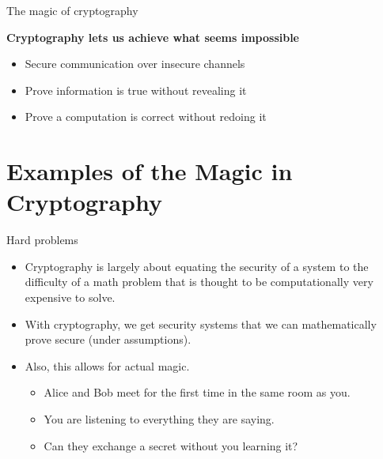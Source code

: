 \ifdefined\PRESENTATION\else\PassOptionsToClass{handout}{beamer}\fi\documentclass[aspectratio=169, lualatex]{beamer}
\begin{document}
\begin{frame}[c]{The magic of cryptography}
	\begin{center}
		\Large\textbf{Cryptography lets us achieve what seems impossible}
		\vspace{1cm}
		\begin{itemize}[<+->]
			\item Secure communication over insecure channels
			\item Prove information is true without revealing it
			\item Prove a computation is correct without redoing it
		\end{itemize}
	\end{center}
\end{frame}

\section{Examples of the Magic in Cryptography}

\begin{frame}{Hard problems}
	\begin{itemize}[<+->]
		\item Cryptography is largely about equating the security of a system to the
		      difficulty of a math problem that is thought to be computationally
		      very expensive to solve.
		\item With cryptography, we get security systems that we can
		      mathematically prove secure (under assumptions).
		\item Also, this allows for actual magic.
		      \begin{itemize}[<+->]
			      \item Alice and Bob meet for the first time in the same room as you.
			      \item You are listening to everything they are saying.
			      \item Can they exchange a secret without you learning it?
		      \end{itemize}
	\end{itemize}
\end{frame}
\end{document}
